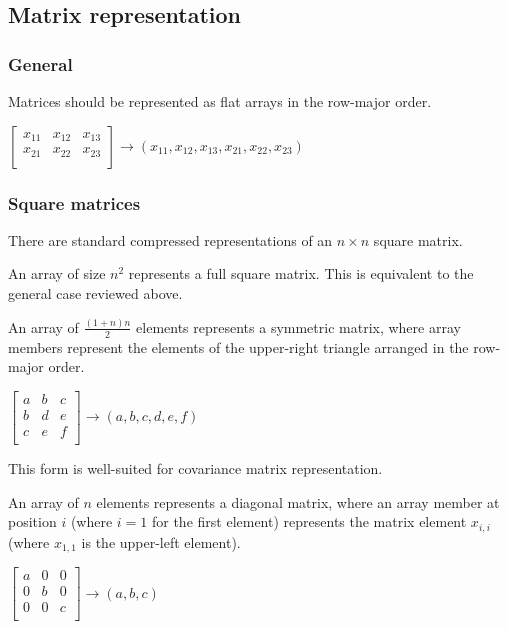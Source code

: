\subsection{Matrix representation}

\subsubsection{General}

Matrices should be represented as flat arrays in the row-major order.

\begin{remark}
    $
    \begin{bmatrix}
        x_{11} & x_{12} & x_{13} \\
        x_{21} & x_{22} & x_{23} \\
    \end{bmatrix} \rightarrow \left(x_{11}, x_{12}, x_{13}, x_{21}, x_{22}, x_{23}\right)
    $
\end{remark}

\subsubsection{Square matrices}

There are standard compressed representations of an $n \times n$ square matrix.

An array of size $n^2$ represents a full square matrix.
This is equivalent to the general case reviewed above.

An array of $\frac{(1 + n) n}{2}$ elements represents a symmetric matrix,
where array members represent the elements of the upper-right triangle arranged in the row-major order.
\begin{remark}
    $
    \begin{bmatrix}
        a & b & c \\
        b & d & e \\
        c & e & f \\
    \end{bmatrix} \rightarrow \left(a, b, c, d, e, f\right)
    $

    This form is well-suited for covariance matrix representation.
\end{remark}

An array of $n$ elements represents a diagonal matrix,
where an array member at position $i$ (where $i=1$ for the first element)
represents the matrix element $x_{i, i}$ (where $x_{1, 1}$ is the upper-left element).
\begin{remark}
    $
    \begin{bmatrix}
        a & 0 & 0 \\
        0 & b & 0 \\
        0 & 0 & c \\
    \end{bmatrix} \rightarrow \left(a, b, c\right)
    $
\end{remark}

